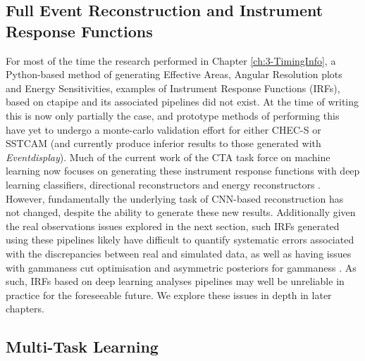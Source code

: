 \subsection{Full Event Reconstruction and Instrument Response Functions}
For most of the time the research performed in Chapter \ref{ch:3-TimingInfo}, a Python-based method of generating Effective Areas, Angular Resolution plots and Energy Sensitivities, examples of Instrument Response Functions (IRFs), based on ctapipe and its associated pipelines did not exist. At the time of writing this is now only partially the case, and prototype methods of performing this have yet to undergo a monte-carlo validation effort for either CHEC-S or SSTCAM (and currently produce inferior results to those generated with \textit{Eventdisplay}). Much of the current work of the CTA task force on machine learning now focuses on generating these instrument response functions with deep learning classifiers, directional reconstructors and energy reconstructors \cite{tjarkicrc}. However, fundamentally the underlying task of CNN-based reconstruction has not changed, despite the ability to generate these new results. Additionally given the real observations issues explored in the next section, such IRFs generated using these pipelines likely have difficult to quantify systematic errors associated with the discrepancies between real and simulated data, as well as having issues with gammaness cut optimisation and asymmetric posteriors for gammaness \cite{mike}. As such, IRFs based on deep learning analyses pipelines may well be unreliable in practice for the foreseeable future. We explore these issues in depth in later chapters.

\subsection{Multi-Task Learning}

